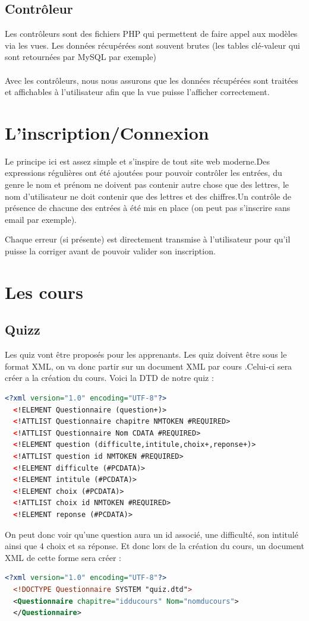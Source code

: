 \documentclass[a4paper,10pt]{article}
\begin{document}
\subsection{Contrôleur}
Les contrôleurs sont des fichiers PHP qui permettent de faire appel aux modèles via les vues. Les données récupérées sont souvent brutes (les tables clé-valeur qui sont retournées par MySQL par exemple)\\\\
Avec les contrôleurs, nous nous assurons que les données récupérées sont traitées et affichables à l'utilisateur afin que la vue puisse l'afficher correctement.

\newpage
\section{L'inscription/Connexion}
Le principe ici est assez simple et s'inspire de tout site web moderne.Des expressions régulières ont été ajoutées pour pouvoir contrôler les entrées, du genre le nom et prénom ne doivent pas contenir autre chose que des lettres, le nom d'utilisateur ne doit contenir que des lettres et des chiffres.Un contrôle de présence de chacune des entrées à été mis en place (on peut pas s'inscrire sans email par exemple).

Chaque erreur (si présente) est directement transmise à l'utilisateur pour qu'il puisse la corriger avant de pouvoir valider son inscription.

\section{Les cours}
\subsection{Quizz}
Les quiz vont être proposés pour les apprenants. Les quiz doivent être sous le format XML, on va donc partir sur un document XML par cours .Celui-ci sera créer a la création du cours.
Voici la DTD de notre quiz : 
\begin{lstlisting}[language=XML]
  <?xml version="1.0" encoding="UTF-8"?>
  <!ELEMENT Questionnaire (question+)>
  <!ATTLIST Questionnaire chapitre NMTOKEN #REQUIRED>
  <!ATTLIST Questionnaire Nom CDATA #REQUIRED>
  <!ELEMENT question (difficulte,intitule,choix+,reponse+)>
  <!ATTLIST question id NMTOKEN #REQUIRED>
  <!ELEMENT difficulte (#PCDATA)>
  <!ELEMENT intitule (#PCDATA)>
  <!ELEMENT choix (#PCDATA)>
  <!ATTLIST choix id NMTOKEN #REQUIRED>
  <!ELEMENT reponse (#PCDATA)>
\end{lstlisting}
On peut donc voir qu'une question aura un id associé, une difficulté, son intitulé ainsi que 4 choix et sa réponse.
Et donc lors de la création du cours, un document XML de cette forme sera créer : 
\begin{lstlisting}[language=XML]
  <?xml version="1.0" encoding="UTF-8"?>
  <!DOCTYPE Questionnaire SYSTEM "quiz.dtd">
  <Questionnaire chapitre="idducours" Nom="nomducours"> 
  </Questionnaire>
\end{lstlisting} 
\end{document}
